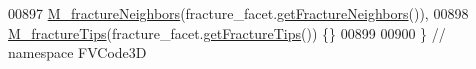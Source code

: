 \begin{DoxyCode}
00897     \hyperlink{classFVCode3D_1_1Rigid__Mesh_1_1Fracture__Facet_ac1812d6492dbf2b3a270cc8db789471f}{M\_fractureNeighbors}(fracture\_facet.\hyperlink{classFVCode3D_1_1Rigid__Mesh_1_1Fracture__Facet_a8938590c97aba07cb21bb9ba8d64cecd}{getFractureNeighbors}()),
00898     \hyperlink{classFVCode3D_1_1Rigid__Mesh_1_1Fracture__Facet_a7bd9c81fb6dca96265060615307b14ad}{M\_fractureTips}(fracture\_facet.\hyperlink{classFVCode3D_1_1Rigid__Mesh_1_1Fracture__Facet_ac505cd03d98e3ff67c9bf8fdc8b42689}{getFractureTips}()) \{\}
00899 
00900 \} \textcolor{comment}{// namespace FVCode3D}
\end{DoxyCode}
